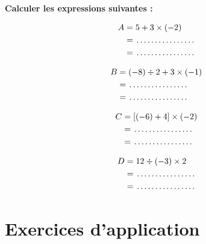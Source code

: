 \begin{examplebox}
\textbf{Calculer les expressions suivantes :}

\noindent
\begin{minipage}[t]{0.48\textwidth}
\begin{align*}
A &= 5 + 3 \times (-2) \\
  &= \trous{2.5cm} \\
  &= \trous{2.5cm}
\end{align*}
\end{minipage}
\hfill
\begin{minipage}[t]{0.48\textwidth}
\begin{align*}
B &= (-8) \div 2 + 3 \times (-1) \\
  &= \trous{2.5cm} \\
  &= \trous{2.5cm}
\end{align*}
\end{minipage}

\vspace{1em}

\noindent
\begin{minipage}[t]{0.48\textwidth}
\begin{align*}
C &= [(-6) + 4] \times (-2) \\
  &= \trous{2.5cm} \\
  &= \trous{2.5cm}
\end{align*}
\end{minipage}
\hfill
\begin{minipage}[t]{0.48\textwidth}
\begin{align*}
D &= 12 \div (-3) \times 2 \\
  &= \trous{2.5cm} \\
  &= \trous{2.5cm}
\end{align*}
\end{minipage}
\end{examplebox}

\section{Exercices d'application}

